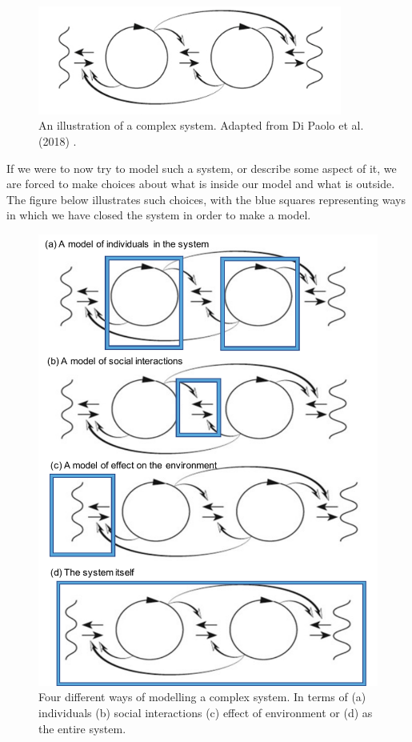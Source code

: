 \begin{figure}[t]
\centering
\includegraphics[width=10cm]{Figures/Complexity/Complexity.png}
\centering
\caption{An illustration of a complex system. Adapted from Di Paolo et al. (2018) \cite{di2018linguistic}.  \label{fig:Complexity}}
\end{figure}

If we were to now try to model such a system, or describe some aspect of it, we are forced to make choices about what is inside our model and what is outside. The figure below illustrates such choices, with the blue squares representing ways in which we have closed the system in order to make a model.



\begin{figure}[p]
\centering
\includegraphics[width=12cm]{Figures/Complexity/ModelsOfComplexity.pdf}
\centering
\caption{Four different ways of modelling a complex system. In terms of (a) individuals (b) social interactions (c) effect of environment or (d) as the entire system. \label{fig:ModelsOfComplexity}} 

\end{figure}


